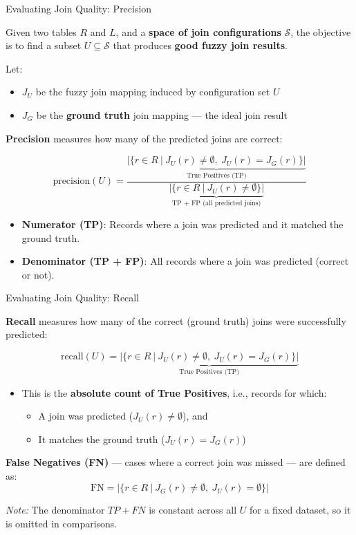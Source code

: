 \documentclass[8pt]{beamer} %
\begin{document}
\begin{frame}{Evaluating Join Quality: Precision}
	
	Given two tables $R$ and $L$, and a \textbf{space of join configurations} $\mathcal{S}$, the objective is to find a subset $U \subseteq \mathcal{S}$ that produces \textbf{good fuzzy join results}.
	
	Let:
	\begin{itemize}
		\item $J_U$ be the fuzzy join mapping induced by configuration set $U$
		\item $J_G$ be the \textbf{ground truth} join mapping — the ideal join result
	\end{itemize}
	
	\vspace{0.5em}
	\textbf{Precision} measures how many of the predicted joins are correct:
	
	\[
	\text{precision}(U) =
	\frac{
		\underbrace{|\{ r \in R\ |\ J_U(r) \neq \emptyset,\ J_U(r) = J_G(r) \}|}_{\text{True Positives (TP)}}
	}{
		\underbrace{|\{ r \in R\ |\ J_U(r) \neq \emptyset \}|}_{\text{TP + FP (all predicted joins)}}
	}
	\]
	
	\begin{itemize}
		\item \textbf{Numerator (TP)}: Records where a join was predicted and it matched the ground truth.
		\item \textbf{Denominator (TP + FP)}: All records where a join was predicted (correct or not).
	\end{itemize}
	
\end{frame}


\begin{frame}{Evaluating Join Quality: Recall}
	
	\textbf{Recall} measures how many of the correct (ground truth) joins were successfully predicted:
	
	\[
	\text{recall}(U) =
	\underbrace{|\{ r \in R\ |\ J_U(r) \neq \emptyset,\ J_U(r) = J_G(r) \}|}_{\text{True Positives (TP)}}
	\]
	
	\begin{itemize}
		\item This is the \textbf{absolute count of True Positives}, i.e., records for which:
		\begin{itemize}
			\item A join was predicted ($J_U(r) \neq \emptyset$), and
			\item It matches the ground truth ($J_U(r) = J_G(r)$)
		\end{itemize}
	\end{itemize}
	
	\vspace{0.5em}
	\textbf{False Negatives (FN)} — cases where a correct join was missed — are defined as:
	\[
	\text{FN} = |\{ r \in R\ |\ J_G(r) \neq \emptyset,\ J_U(r) = \emptyset \}|
	\]
	
	\textit{Note:} The denominator $TP + FN$ is constant across all $U$ for a fixed dataset, so it is omitted in comparisons.
	
\end{frame}
\end{document}
